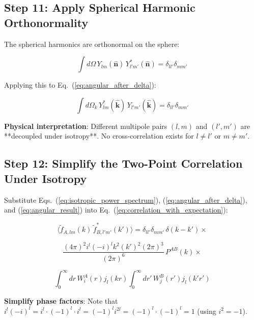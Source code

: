 \subsection{Step 11: Apply Spherical Harmonic Orthonormality}

The spherical harmonics are orthonormal on the sphere:

\begin{equation}
    \int d\Omega \, Y_{lm}(\hat{\mathbf{n}}) \, Y_{l'm'}^*(\hat{\mathbf{n}}) = \delta_{ll'} \delta_{mm'}
\label{eq:sh_orthonorm}
\end{equation}

Applying this to Eq.~(\ref{eq:angular_after_delta}):

\begin{equation}
    \int d\Omega_k \, Y_{lm}^*(\hat{\mathbf{k}}) \, Y_{l'm'}(\hat{\mathbf{k}}) = \delta_{ll'} \delta_{mm'}
\label{eq:angular_result}
\end{equation}

\textbf{Physical interpretation}: Different multipole pairs $(l,m)$ and $(l',m')$ are **decoupled under isotropy**. No cross-correlation exists for $l \neq l'$ or $m \neq m'$.

\subsection{Step 12: Simplify the Two-Point Correlation Under Isotropy}

Substitute Eqs.~(\ref{eq:isotropic_power_spectrum}), (\ref{eq:angular_after_delta}), and (\ref{eq:angular_result}) into Eq.~(\ref{eq:correlation_with_expectation}):

\begin{equation}
    \langle \tilde{f}_{A,lm}(k) \, \tilde{f}_{B,l'm'}^*(k') \rangle = \delta_{ll'} \delta_{mm'} \, \delta(k - k') \times
\label{eq:iso_correlation}
\end{equation}

\begin{equation}
    \frac{(4\pi)^2 i^{l} (-i)^{l} k^2 (k')^2 (2\pi)^3}{(2\pi)^6} \, P^{AB}(k) \times
\end{equation}

\begin{equation}
    \int_0^{\infty} dr \, W_i^A(r) j_{l}(kr) \int_0^{\infty} dr' \, W_j^B(r') j_{l}(k'r')
\end{equation}

\textbf{Simplify phase factors}: Note that $i^l (-i)^l = i^l \cdot (-1)^l \cdot i^l = (-1)^l i^{2l} = (-1)^l \cdot (-1)^l = 1$ (using $i^2 = -1$).

